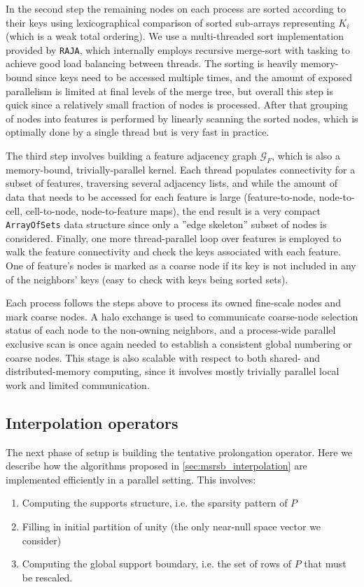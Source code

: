 In the second step the remaining nodes on each process are sorted according to their keys using lexicographical comparison of sorted sub-arrays representing $K_i$ (which is a weak total ordering).   We use a multi-threaded sort implementation provided by \texttt{RAJA}, which internally employs recursive merge-sort with tasking to achieve good load balancing between threads.   The sorting is heavily memory-bound since keys need to be accessed multiple times, and the amount of exposed parallelism is limited at final levels of the merge tree, but overall this step is quick since a relatively small fraction of nodes is processed.   After that grouping of nodes into features is performed by linearly scanning the sorted nodes, which is optimally done by a single thread but is very fast in practice.

The third step involves building a feature adjacency graph $\mathcal{G}_F$, which is also a memory-bound, trivially-parallel kernel.   Each thread populates connectivity for a subset of features, traversing several adjacency lists, and while the amount of data that needs to be accessed for each feature is large (feature-to-node, node-to-cell, cell-to-node, node-to-feature maps), the end result is a very compact \texttt{ArrayOfSets} data structure since only a ''edge skeleton'' subset of nodes is considered.   Finally, one more thread-parallel loop over features is employed to walk the feature connectivity and check the keys associated with each feature.   One of feature's nodes is marked as a coarse node if its key is not included in any of the neighbors' keys (easy to check with keys being sorted sets).

Each process follows the steps above to process its owned fine-scale nodes and mark coarse nodes.   A halo exchange is used to communicate coarse-node selection status of each node to the non-owning neighbors, and a process-wide parallel exclusive scan is once again needed to establish a consistent global numbering or coarse nodes.   This stage is also scalable with respect to both shared- and distributed-memory computing, since it involves mostly trivially parallel local work and limited communication.

\subsection{Interpolation operators}
\label{subsec:par_kernels_support}

The next phase of setup is building the tentative prolongation operator.   Here we describe how the algorithms proposed in \autoref{sec:msrsb_interpolation} are implemented efficiently in a parallel setting.   This involves:
\begin{enumerate}
    \item Computing the supports structure, i.e. the sparsity pattern of $P$
    \item Filling in initial partition of unity (the only near-null space vector we consider)
    \item Computing the global support boundary, i.e. the set of rows of $P$ that must be rescaled.
\end{enumerate}

